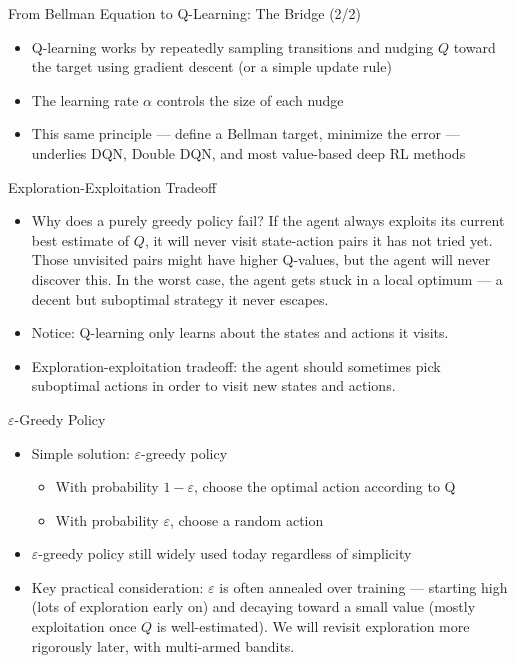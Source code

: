 \begin{frame}{From Bellman Equation to Q-Learning: The Bridge (2/2)}
\begin{itemize}
    \item Q-learning works by repeatedly sampling transitions and nudging $Q$ toward the target using gradient descent (or a simple update rule)
    \item The learning rate $\alpha$ controls the size of each nudge
    \item This same principle --- define a Bellman target, minimize the error --- underlies DQN, Double DQN, and most value-based deep RL methods
\end{itemize}
\end{frame}

\begin{frame}{Exploration-Exploitation Tradeoff}
\begin{itemize}
    \item Why does a purely greedy policy fail? If the agent always exploits its current best estimate of $Q$, it will never visit state-action pairs it has not tried yet. Those unvisited pairs might have higher Q-values, but the agent will never discover this. In the worst case, the agent gets stuck in a local optimum --- a decent but suboptimal strategy it never escapes.
    \item Notice: Q-learning only learns about the states and actions it visits.
    \item Exploration-exploitation tradeoff: the agent should sometimes pick suboptimal actions in order to visit new states and actions.
\end{itemize}
\end{frame}

\begin{frame}{$\varepsilon$-Greedy Policy}
\begin{itemize}
    \item Simple solution: $\varepsilon$-greedy policy
    \begin{itemize}
        \item With probability $1 - \varepsilon$, choose the optimal action according to Q
        \item With probability $\varepsilon$, choose a random action
    \end{itemize}
    \item $\varepsilon$-greedy policy still widely used today regardless of simplicity
    \item Key practical consideration: $\varepsilon$ is often annealed over training --- starting high (lots of exploration early on) and decaying toward a small value (mostly exploitation once $Q$ is well-estimated). We will revisit exploration more rigorously later, with multi-armed bandits.
\end{itemize}
\end{frame}

